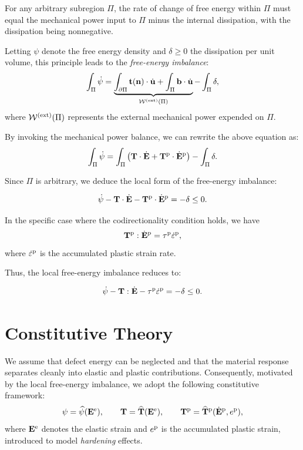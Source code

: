 \begin{definition}
	For any arbitrary subregion \( \Pi \), the rate of change of free energy within \( \Pi \) must equal the mechanical power input to \( \Pi \) minus the internal dissipation, with the dissipation being nonnegative.
\end{definition}

Letting \( \psi \) denote the free energy density and \( \delta \geq 0 \) the dissipation per unit volume, this principle leads to the \textit{free-energy imbalance}:
\[
\int_\Pi \dot{\psi}  = \underbrace{ \int_{\partial \Pi} \mathbf{t}(\mathbf{n}) \cdot \dot{\mathbf{u}}  + \int_\Pi \mathbf{b} \cdot \dot{\mathbf{u}}  }_{\mathcal{W}^{\rm (ext)}(\Pi)} - \int_\Pi \delta ,
\]
where \( \mathcal{W}^{\rm (ext)}(\Pi) \) represents the external mechanical power expended on \( \Pi \).

By invoking the mechanical power balance, we can rewrite the above equation as:
\[
\int_\Pi \dot{\psi}  = \int_\Pi \left( \mathbf{T} \cdot \dot{\mathbf{E}} + \mathbf{T}^{\rm p} \cdot \dot{\mathbf{E}}^{\rm p} \right)  - \int_\Pi \delta .
\]

Since \( \Pi \) is arbitrary, we deduce the local form of the free-energy imbalance:
\begin{definition}
	\[
\dot{\psi} - \mathbf{T} \cdot \dot{\mathbf{E}} - \mathbf{T}^{\rm p} \cdot\dot{\mathbf{E}}^{\rm p} = -\delta \leq 0.
\]
\end{definition}



In the specific case where the codirectionality condition holds, we have
\[
\mathbf{T}^{\rm p} : \dot{\mathbf{E}}^{\rm p} = \tau^{\rm p} \dot{\varepsilon}^{\rm p},
\]
where \( \dot{\varepsilon}^{\rm p} \) is the accumulated plastic strain rate.

Thus, the local free-energy imbalance reduces to:
\begin{definition}
	\begin{equation}\label{fePLA}
\dot{\psi} - \mathbf{T} : \dot{\mathbf{E}} - \tau^{\rm p} \dot{\varepsilon}^{\rm p} = -\delta \leq 0.
	\end{equation}
\end{definition}

\section{Constitutive Theory}
We assume that defect energy can be neglected and that the material response separates cleanly into elastic and plastic contributions. Consequently, motivated by the local free-energy imbalance, we adopt the following constitutive framework:
\begin{equation}\label{constPLA}
	\psi = \widehat{\psi}(\mathbf{E}^{\rm e}), \qquad \mathbf{T} = \widehat{\mathbf{T}}(\mathbf{E}^{\rm e}), \qquad \mathbf{T}^{\rm p} = \widehat{\mathbf{T}}^{\rm p}(\dot{\mathbf{E}}^{\rm p}, e^{\rm p}),
\end{equation}
where \( \mathbf{E}^{\rm e} \) denotes the elastic strain and \( e^{\rm p} \) is the accumulated plastic strain, introduced to model \textit{hardening} effects.

